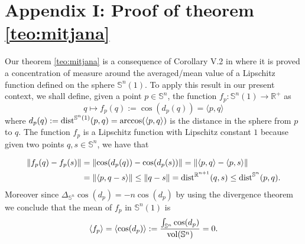 \documentclass[11pt,letterpaper]{amsart}
\theoremstyle{definition}
\theoremstyle{remark}
\newcommand{\erre}{\mathbb{R}}
\newcommand{\ese}{\mathbb{S}}
\begin{document}
\section*{Appendix I: Proof of theorem \ref{teo:mitjana}}\label{appendix}

Our theorem \ref{teo:mitjana}  is a consequence of Corollary V.2 in \cite{MS} where it is proved a concentration of measure around the averaged/mean value of a Lipschitz function defined on the sphere $\ese^n(1)$. To apply this result in our present context, we shall define, given a point $p\in \mathbb{S}^n$, the function $f_p: \ese^n(1) \rightarrow \erre^+$ as
$$
q\mapsto f_p(q):=\cos(d_p(q))=\langle p, q\rangle 
$$
\noindent where $d_p(q):={\rm dist}^{\ese^n(1)}(p,q)={\rm arccos}(\langle p, q\rangle)$ is the distance in the sphere from $p$ to $q$.
The function $f_p$ is a Lipschitz function with Lipschitz constant $1$ because given two points  $q,s\in \mathbb{S}^n$, we have that 

$$
\begin{aligned}
    \left\Vert f_p(q)-f_p(s)\right\Vert&=\left\Vert \cos(d_p(q))-\cos(d_p(s))\right\Vert=\Vert \langle p, q\rangle-\langle p, s\rangle \Vert \\&=\Vert \langle p, q- s\rangle \Vert
\leq \Vert q-s\Vert={\rm dist}^{\mathbb{R}^{n+1}}(q,s)
\leq  {\rm dist}^{\mathbb{S}^n}(p,q).
\end{aligned}
$$
Moreover since $\Delta_{\mathbb{S}^{n}}\cos(d_p)=-n\cos(d_p)$ by using the divergence theorem we conclude that the mean of $f_p$ in $\ese^n(1)$ is 
$$
\langle f_p \rangle=\langle \cos(d_p)\rangle:=\frac{\int_{\mathbb{S}^n}\cos(d_p)}{{\rm vol}(\mathbb{S}^n)}=0.
$$
\end{document}

